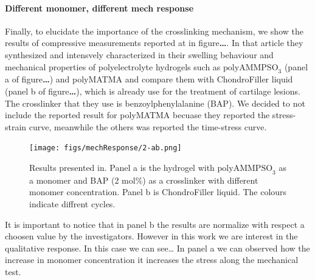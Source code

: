 \newpage

\paragraph{Different monomer, different mech response}
Finally, to elucidate the importance of the crosslinking mechanism, we show the results of compressive measurements reported at\citep{romischkeSwellingMechanicalCharacterization2022} in figure\textbf{\ldots}.
In that article they synthesized and intensvely characterized in their swelling behaviour and mechanical properties of polyelectrolyte hydrogels such as $\mathrm{polyAMMPSO}_3$ (panel a of figure\textbf{\ldots}) and polyMATMA and compare them with ChondroFiller liquid (panel b of figure\textbf{\ldots}), which is already use for the treatment of cartilage lesions.
The crosslinker that they use is benzoylphenylalanine (BAP).
We decided to not include the reported result for polyMATMA becuase they reported the stress-strain curve, meanwhile the others was reported the time-stress curve.

\begin{figure}[ht!]
    \centering
    \texttt{[image: figs/mechResponse/2-ab.png]}
    \caption{
        Results presented in\citep{romischkeSwellingMechanicalCharacterization2022}. 
    Panel a is the hydrogel with $\mathrm{polyAMMPSO}_3$ as a monomer and BAP (2 mol\%) as a crosslinker with different monomer concentration.
    Panel b is ChondroFiller liquid.
    The colours indicate diffrent cycles.
    }
\end{figure}

It is important to notice that in panel b the results are normalize with respect a choosen value by the investigators.
However in this work we are interest in the qualitative response.
In this case we can see\ldots
In panel a we can observed how the increase in monomer concentration it increases the stress along the mechanical test.


